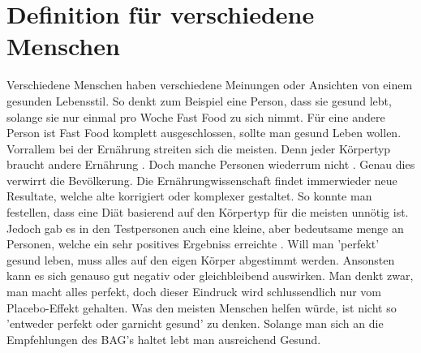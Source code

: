 \section{Definition für verschiedene Menschen}
Verschiedene Menschen haben verschiedene Meinungen oder Ansichten von einem gesunden Lebensstil. So denkt zum Beispiel eine Person, dass sie gesund lebt, solange sie nur einmal pro Woche Fast Food zu sich nimmt. Für eine andere Person ist Fast Food komplett ausgeschlossen, sollte man gesund Leben wollen. Vorrallem bei der Ernährung streiten sich die meisten. Denn jeder Körpertyp braucht andere Ernährung \cite{all-about-body-type-eating}. Doch manche Personen wiederrum nicht \cite{all-about-body-type-eating}. Genau dies verwirrt die Bevölkerung.
\newline
Die Ernährungwissenschaft findet immerwieder neue Resultate, welche alte korrigiert oder komplexer gestaltet. So konnte man festellen, dass eine Diät basierend auf den Körpertyp für die meisten unnötig ist. Jedoch gab es in den Testpersonen auch eine kleine, aber bedeutsame menge an Personen, welche ein sehr positives Ergebniss erreichte \cite{all-about-body-type-eating}.
\newline
\newline
Will man 'perfekt' gesund leben, muss alles auf den eigen Körper abgestimmt werden. Ansonsten kann es sich genauso gut negativ oder gleichbleibend auswirken. Man denkt zwar, man macht alles perfekt, doch dieser Eindruck wird schlussendlich nur vom Placebo-Effekt gehalten.
\newline
\newline
Was den meisten Menschen helfen würde, ist nicht so 'entweder perfekt oder garnicht gesund' zu denken. Solange man sich an die Empfehlungen des BAG's haltet lebt man ausreichend Gesund.
